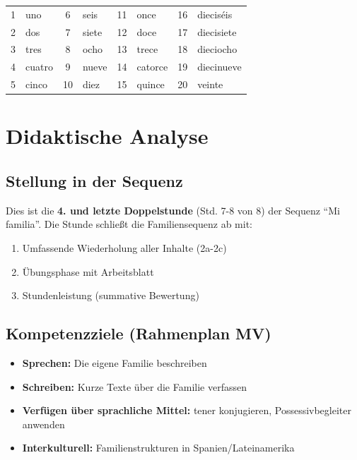 \documentclass[11pt,a4paper]{article}
\newcommand{\reihenthema}{Mi familia}
\begin{document}
\begin{center}
\begin{tabular}{|c|l|c|l|c|l|c|l|}
\hline
1 & uno & 6 & seis & 11 & once & 16 & dieciséis \\
2 & dos & 7 & siete & 12 & doce & 17 & diecisiete \\
3 & tres & 8 & ocho & 13 & trece & 18 & dieciocho \\
4 & cuatro & 9 & nueve & 14 & catorce & 19 & diecinueve \\
5 & cinco & 10 & diez & 15 & quince & 20 & veinte \\
\hline
\end{tabular}
\end{center}

\section{Didaktische Analyse}

\subsection{Stellung in der Sequenz}
Dies ist die \textbf{4. und letzte Doppelstunde} (Std. 7-8 von 8) der Sequenz ``\reihenthema''.
Die Stunde schließt die Familiensequenz ab mit:
\begin{enumerate}
    \item Umfassende Wiederholung aller Inhalte (2a-2c)
    \item Übungsphase mit Arbeitsblatt
    \item Stundenleistung (summative Bewertung)
\end{enumerate}

\subsection{Kompetenzziele (Rahmenplan MV)}
\begin{itemize}
    \item \textbf{Sprechen:} Die eigene Familie beschreiben
    \item \textbf{Schreiben:} Kurze Texte über die Familie verfassen
    \item \textbf{Verfügen über sprachliche Mittel:} tener konjugieren, Possessivbegleiter anwenden
    \item \textbf{Interkulturell:} Familienstrukturen in Spanien/Lateinamerika
\end{itemize}
\end{document}

